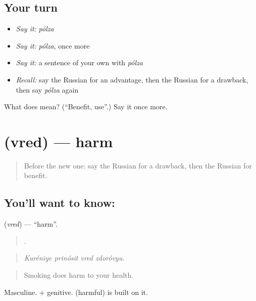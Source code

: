 \subsection*{Your turn}
\begin{itemize}
\raggedright
  \item \emph{Say it:} \emph{pólza}
  \item \emph{Say it:} \emph{pólza}, once more
  \item \emph{Say it:} a sentence of your own with \emph{pólza}
  \item \emph{Recall:} say the Russian for an advantage, then the Russian for a drawback, then say \emph{pólza} again
\end{itemize}

\begin{tcolorbox}[breakable,colback=teal!4,colframe=teal!35!black,title={Before you move on}]
What does  mean? (\textquotedblleft{}Benefit, use\textquotedblright{}.) Say it once more.
\end{tcolorbox}
\section[\texorpdfstring{\ru{вред} (vred)}{вред (vred)}]{ (vred) — harm}

\label{lesson:RU-C346-vred}



\begin{quote}
Before the new one: say the Russian for a drawback, then the Russian for benefit.
\end{quote}

\subsection*{You'll want to know: }
\textbf{} (\emph{vred}) — \textquotedblleft{}harm\textquotedblright{}.

\begin{quote}
   .
\end{quote}

\begin{quote}
\emph{Kuréniye prinósit vred zdoróvyu.}
\end{quote}

\begin{quote}
Smoking does harm to your health.
\end{quote}

Masculine. \emph{  } + genitive. \emph{} (harmful) is built on it.

